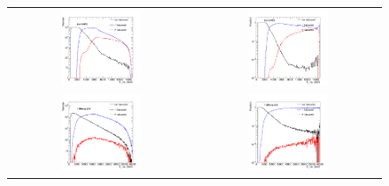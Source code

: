 \begin{figure}[bh]
  \begin{center}
    \begin{tabular}{cc}
      \includegraphics[width=0.45\textwidth]{chapters/Zprime/Saturation/images/FlatPt/Sample_variables/N_s_vs_Emc_Barrel.png} &
      \includegraphics[width=0.45\textwidth]{chapters/Zprime/Saturation/images/FlatPt/Sample_variables/N_s_vs_Emc_fraBarrel.png} \\
      \includegraphics[width=0.45\textwidth]{chapters/Zprime/Saturation/images/FlatPt/Sample_variables/N_s_vs_Emc_Endcap.png} &
      \includegraphics[width=0.45\textwidth]{chapters/Zprime/Saturation/images/FlatPt/Sample_variables/N_s_vs_Emc_fraEndcap.png} \\

\end{tabular}
\end{center}
\end{figure}
